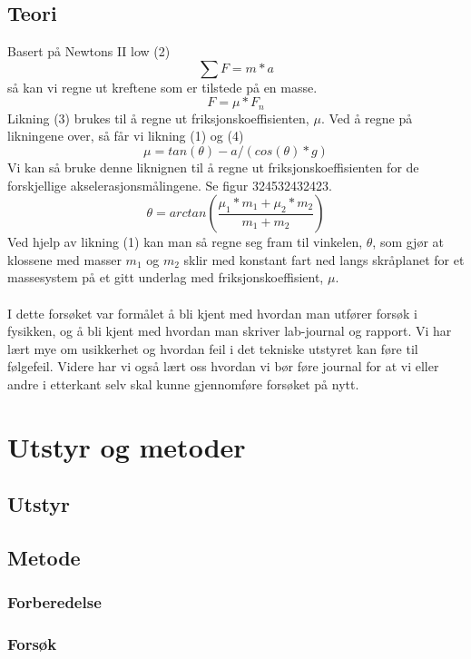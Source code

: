\documentclass[10pt,a4paper]{report}
\begin{document}
\section*{Teori}
Basert på Newtons II low (2) 
\begin{equation}
\sum{F} = m*a
\end{equation} så kan vi regne ut kreftene som er tilstede på en masse. 
\begin{equation}
F = \mu *F_n
\end{equation}
Likning (3) brukes til å regne ut friksjonskoeffisienten, $\mu$. Ved å regne på likningene over, så får vi likning (1) og (4)
\begin{equation}
\mu = tan(\theta)-a/(cos(\theta)*g)
\end{equation}
Vi kan så bruke denne liknignen til å regne ut friksjonskoeffisienten for de forskjellige akselerasjonsmålingene. Se figur 324532432423. 
\begin{equation}
\theta = arctan(\frac{\mu_1*m_1+\mu_2*m_2}{m_1+m_2})
\end{equation}
Ved hjelp av likning (1) kan man så regne seg fram til vinkelen, $\theta$, som gjør at klossene med masser $m_1$ og $m_2$ sklir med konstant fart ned langs skråplanet for et massesystem på et gitt underlag med friksjonskoeffisient, $\mu$.\\
\\I dette forsøket var formålet å bli kjent med hvordan man utfører forsøk i fysikken, og å bli kjent med hvordan man skriver lab-journal og rapport. Vi har lært mye om usikkerhet og hvordan feil i det tekniske utstyret kan føre til følgefeil. Videre har vi også lært oss hvordan vi bør føre journal for at vi eller andre i etterkant selv skal kunne gjennomføre forsøket på nytt.

\chapter*{Utstyr og metoder}
\section*{Utstyr}
\section*{Metode}
\subsection*{Forberedelse}
\subsection*{Forsøk}
\end{document}
